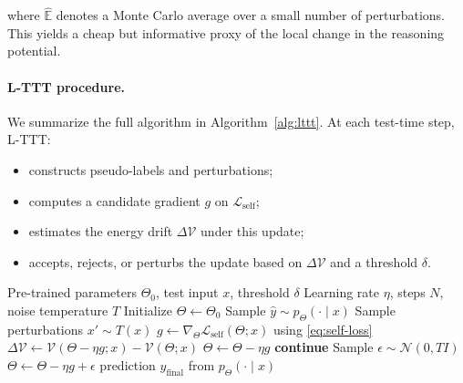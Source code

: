 \documentclass{article}
\theoremstyle{plain}
\theoremstyle{definition}
\theoremstyle{remark}
\newcommand{\E}{\mathbb{E}}
\newcommand{\Lyap}{\mathcal{V}}            %
\begin{document}
where $\hat{\E}$ denotes a Monte Carlo average over a small number of perturbations. This yields a cheap but informative proxy of the local change in the reasoning potential.

\paragraph{L-TTT procedure.}
We summarize the full algorithm in Algorithm~\ref{alg:lttt}. At each test-time step, L-TTT:

\begin{itemize}
    \item constructs pseudo-labels and perturbations;
    \item computes a candidate gradient $g$ on $\mathcal{L}_{\text{self}}$;
    \item estimates the energy drift $\Delta \Lyap$ under this update;
    \item accepts, rejects, or perturbs the update based on $\Delta \Lyap$ and a threshold $\delta$.
\end{itemize}

\begin{algorithm}[tb]
   \caption{Lyapunov-Guided Test-Time Training (L-TTT)}
   \label{alg:lttt}
\begin{algorithmic}[1]  %
    Pre-trained parameters $\Theta_0$, test input $x$, threshold $\delta$
    Learning rate $\eta$, steps $N$, noise temperature $T$
   \STATE Initialize $\Theta \leftarrow \Theta_0$
       \STATE Sample $\hat{y} \sim p_{\Theta}(\cdot \mid x)$
       \STATE Sample perturbations $x' \sim T(x)$
       \STATE $g \leftarrow \nabla_{\Theta} \mathcal{L}_{\text{self}}(\Theta; x)$ using \eqref{eq:self-loss}
       \STATE $\Delta \Lyap \leftarrow \Lyap(\Theta - \eta g; x) - \Lyap(\Theta; x)$
       \IF{$\Delta \Lyap < 0$}
           \STATE $\Theta \leftarrow \Theta - \eta g$ 
       \ELSIF{$\Delta \Lyap > \delta$}
           \STATE \textbf{continue} 
       \ELSE
           \STATE Sample $\epsilon \sim \mathcal{N}(0, T I)$
           \STATE $\Theta \leftarrow \Theta - \eta g + \epsilon$ 
       \ENDIF
   \ENDFOR
    prediction $y_{\mathrm{final}}$ from $p_{\Theta}(\cdot \mid x)$
\end{algorithmic}
\end{algorithm}
\end{document}
